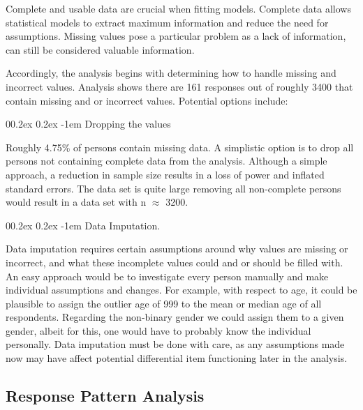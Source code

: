 \documentclass[
  man,floatsintext]{apa6}
\makeatletter
\let\oldparagraph\paragraph
\renewcommand{\paragraph}[1]{\oldparagraph{#1}\mbox{}}
\renewcommand{\paragraph}{\@startsection{paragraph}{4}{\parindent}%
  {0\baselineskip \@plus 0.2ex \@minus 0.2ex}%
  {-1em}%
  {\normalfont\normalsize\bfseries\itshape\typesectitle}}
\makeatother
\begin{document}
Complete and usable data are crucial when fitting models. Complete data allows statistical models to extract maximum information and reduce the need for assumptions. Missing values pose a particular problem as a lack of information, can still be considered valuable information.

Accordingly, the analysis begins with determining how to handle missing and incorrect values. Analysis shows there are 161 responses out of roughly 3400 that contain missing and or incorrect values. Potential options include:

\hypertarget{dropping-the-values}{%
\paragraph{Dropping the values}\label{dropping-the-values}}

Roughly 4.75\% of persons contain missing data. A simplistic option is to drop all persons not containing complete data from the analysis. Although a simple approach, a reduction in sample size results in a loss of power and inflated standard errors. The data set is quite large removing all non-complete persons would result in a data set with n \(\approx\) 3200.

\hypertarget{data-imputation.}{%
\paragraph{Data Imputation.}\label{data-imputation.}}

Data imputation requires certain assumptions around why values are missing or incorrect, and what these incomplete values could and or should be filled with. An easy approach would be to investigate every person manually and make individual assumptions and changes. For example, with respect to age, it could be plausible to assign the outlier age of 999 to the mean or median age of all respondents.
Regarding the non-binary gender we could assign them to a given gender, albeit for this, one would have to probably know the individual personally. Data imputation must be done with care, as any assumptions made now may have affect potential differential item functioning later in the analysis.

\hypertarget{response-pattern-analysis}{%
\subsection{Response Pattern Analysis}\label{response-pattern-analysis}}
\end{document}
